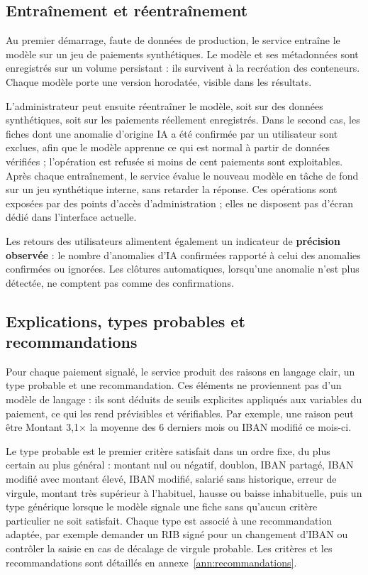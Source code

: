 \subsection{Entraînement et réentraînement}

Au premier démarrage, faute de données de production, le service entraîne le modèle sur un jeu de paiements synthétiques. Le modèle et ses métadonnées sont enregistrés sur un volume persistant : ils survivent à la recréation des conteneurs. Chaque modèle porte une version horodatée, visible dans les résultats.

L'administrateur peut ensuite réentraîner le modèle, soit sur des données synthétiques, soit sur les paiements réellement enregistrés. Dans le second cas, les fiches dont une anomalie d'origine IA a été confirmée par un utilisateur sont exclues, afin que le modèle apprenne ce qui est normal à partir de données vérifiées ; l'opération est refusée si moins de cent paiements sont exploitables. Après chaque entraînement, le service évalue le nouveau modèle en tâche de fond sur un jeu synthétique interne, sans retarder la réponse. Ces opérations sont exposées par des points d'accès d'administration ; elles ne disposent pas d'écran dédié dans l'interface actuelle.

Les retours des utilisateurs alimentent également un indicateur de \textbf{précision observée} : le nombre d'anomalies d'IA confirmées rapporté à celui des anomalies confirmées ou ignorées. Les clôtures automatiques, lorsqu'une anomalie n'est plus détectée, ne comptent pas comme des confirmations.

\subsection{Explications, types probables et recommandations}

Pour chaque paiement signalé, le service produit des raisons en langage clair, un type probable et une recommandation. Ces éléments ne proviennent pas d'un modèle de langage : ils sont déduits de seuils explicites appliqués aux variables du paiement, ce qui les rend prévisibles et vérifiables. Par exemple, une raison peut être \og Montant 3,1$\times$ la moyenne des 6 derniers mois\fg{} ou \og IBAN modifié ce mois-ci\fg{}.

Le type probable est le premier critère satisfait dans un ordre fixe, du plus certain au plus général : montant nul ou négatif, doublon, IBAN partagé, IBAN modifié avec montant élevé, IBAN modifié, salarié sans historique, erreur de virgule, montant très supérieur à l'habituel, hausse ou baisse inhabituelle, puis un type générique lorsque le modèle signale une fiche sans qu'aucun critère particulier ne soit satisfait. Chaque type est associé à une recommandation adaptée, par exemple demander un RIB signé pour un changement d'IBAN ou contrôler la saisie en cas de décalage de virgule probable. Les critères et les recommandations sont détaillés en annexe~\ref{ann:recommandations}.


